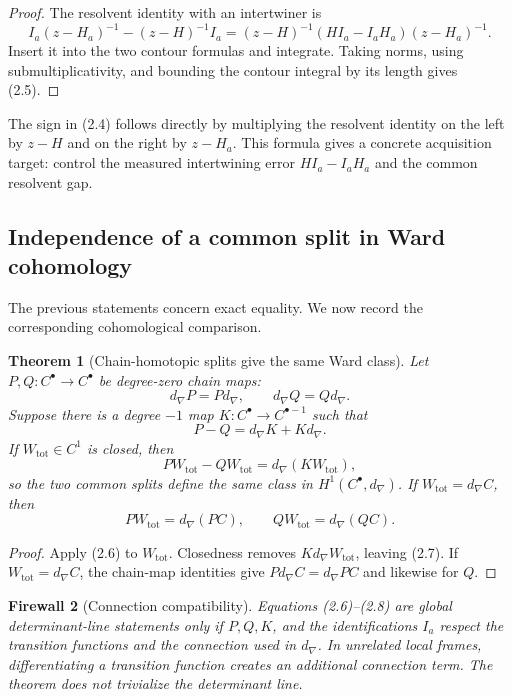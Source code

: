 \documentclass[11pt]{article}
\newtheorem{theorem}{Theorem}[section]
\newtheorem{firewall}[theorem]{Firewall}
\begin{document}
\begin{proof}
The resolvent identity with an intertwiner is
\[
 I_a(z-H_a)^{-1}-(z-H)^{-1}I_a
 =
 (z-H)^{-1}(HI_a-I_aH_a)(z-H_a)^{-1}.
\]
Insert it into the two contour formulas and integrate.  Taking norms,
using submultiplicativity, and bounding the contour integral by its length
gives (2.5).
\end{proof}

The sign in (2.4) follows directly by multiplying the resolvent identity
on the left by \(z-H\) and on the right by \(z-H_a\).  This formula gives
a concrete acquisition target: control the measured intertwining error
\(HI_a-I_aH_a\) and the common resolvent gap.

\subsection{Independence of a common split in Ward cohomology}

The previous statements concern exact equality.  We now record the
corresponding cohomological comparison.

\begin{theorem}[Chain-homotopic splits give the same Ward class]
\label{thm:v11v2-chain-homotopy}
Let \(P,Q:C^\bullet\to C^\bullet\) be degree-zero chain maps:
\[
 d_\nabla P=Pd_\nabla,\qquad d_\nabla Q=Qd_\nabla.
\]
Suppose there is a degree \(-1\) map \(K:C^\bullet\to C^{\bullet-1}\)
such that
\[
 P-Q=d_\nabla K+Kd_\nabla.
 \tag{2.6}
\]
If \(W_{\mathrm{tot}}\in C^1\) is closed, then
\[
 PW_{\mathrm{tot}}-QW_{\mathrm{tot}}
 =
 d_\nabla(KW_{\mathrm{tot}}),
 \tag{2.7}
\]
so the two common splits define the same class in
\(H^1(C^\bullet,d_\nabla)\).  If
\(W_{\mathrm{tot}}=d_\nabla C\), then
\[
 PW_{\mathrm{tot}}=d_\nabla(PC),
 \qquad
 QW_{\mathrm{tot}}=d_\nabla(QC).
 \tag{2.8}
\]
\end{theorem}

\begin{proof}
Apply (2.6) to \(W_{\mathrm{tot}}\).  Closedness removes
\(Kd_\nabla W_{\mathrm{tot}}\), leaving (2.7).  If
\(W_{\mathrm{tot}}=d_\nabla C\), the chain-map identities give
\(Pd_\nabla C=d_\nabla PC\) and likewise for \(Q\).
\end{proof}

\begin{firewall}[Connection compatibility]
\label{fw:v11v2-connection}
Equations (2.6)--(2.8) are global determinant-line statements only if
\(P,Q,K\), and the identifications \(I_a\) respect the transition
functions and the connection used in \(d_\nabla\).  In unrelated local
frames, differentiating a transition function creates an additional
connection term.  The theorem does not trivialize the determinant line.
\end{firewall}
\end{document}
